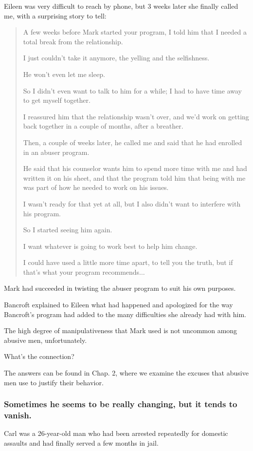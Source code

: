 \documentclass[oneside]{article}
\numberwithin{equation}{section}
\begin{document}
%
Eileen was very difficult to reach by phone, but 3 weeks later she finally called me, with a surprising story to tell:
\begin{quotation}
    A few weeks before Mark started your program, I told him that I needed a total break from the relationship.
    
    I just couldn't take it anymore, the yelling and the selfishness.
    
    He won't even let me sleep.
    
    So I didn't even want to talk to him for a while; I had to have time away to get myself together.
    
    I reassured him that the relationship wasn't over, and we'd work on getting back together in a couple of months, after a breather.
    
    Then, a couple of weeks later, he called me and said that he had enrolled in an abuser program.
    
    He said that his counselor wants him to spend more time with me and had written it on his sheet, and that the program told him that being with me was part of how he needed to work on his issues.
    
    I wasn't ready for that yet at all, but I also didn't want to interfere with his program.
    
    So I started seeing him again.
    
    I want whatever is going to work best to help him change.
    
    I could have used a little more time apart, to tell you the truth, but if that's what your program recommends$\ldots$
\end{quotation}
Mark had succeeded in twisting the abuser program to suit his own purposes.

Bancroft explained to Eileen what had happened and apologized for the way Bancroft's program had added to the many difficulties she already had with him.

The high degree of manipulativeness that Mark used is not uncommon among abusive men, unfortunately.


What's the connection?

The answers can be found in Chap. 2, where we examine the excuses that abusive men use to justify their behavior.

\subsubsection{Sometimes he seems to be really changing, but it tends to vanish.}
Carl was a 26-year-old man who had been arrested repeatedly for domestic assaults and had finally served a few months in jail.
\end{document}
